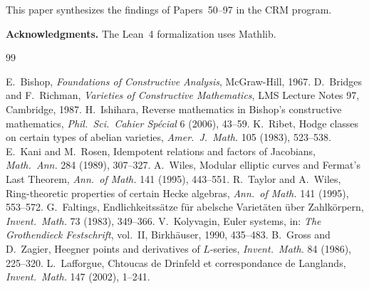 \documentclass[11pt,a4paper]{article}
\theoremstyle{plain}
\theoremstyle{definition}
\begin{document}
This paper synthesizes the findings of Papers~50--97 in the CRM program.

\bigskip
\noindent\textbf{Acknowledgments.} The Lean~4 formalization uses Mathlib.

\begin{thebibliography}{99}

 E.\ Bishop, \emph{Foundations of Constructive Analysis}, McGraw-Hill, 1967.
 D.\ Bridges and F.\ Richman, \emph{Varieties of Constructive Mathematics}, LMS Lecture Notes 97, Cambridge, 1987.
 H.\ Ishihara, Reverse mathematics in Bishop's constructive mathematics, \emph{Phil.\ Sci.\ Cahier Sp\'ecial} 6 (2006), 43--59.
 K.\ Ribet, Hodge classes on certain types of abelian varieties, \emph{Amer.\ J.\ Math.} 105 (1983), 523--538.
 E.\ Kani and M.\ Rosen, Idempotent relations and factors of Jacobians, \emph{Math.\ Ann.} 284 (1989), 307--327.
 A.\ Wiles, Modular elliptic curves and Fermat's Last Theorem, \emph{Ann.\ of Math.} 141 (1995), 443--551.
 R.\ Taylor and A.\ Wiles, Ring-theoretic properties of certain Hecke algebras, \emph{Ann.\ of Math.} 141 (1995), 553--572.
 G.\ Faltings, Endlichkeitss\"atze f\"ur abelsche Variet\"aten \"uber Zahlk\"orpern, \emph{Invent.\ Math.} 73 (1983), 349--366.
 V.\ Kolyvagin, Euler systems, in: \emph{The Grothendieck Festschrift}, vol.~II, Birkh\"auser, 1990, 435--483.
 B.\ Gross and D.\ Zagier, Heegner points and derivatives of $L$-series, \emph{Invent.\ Math.} 84 (1986), 225--320.
 L.\ Lafforgue, Chtoucas de Drinfeld et correspondance de Langlands, \emph{Invent.\ Math.} 147 (2002), 1--241.

\end{thebibliography}
\end{document}
